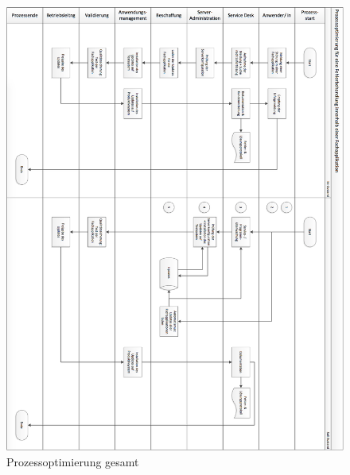     \begin{figure}
	    \centering
	    \includegraphics[width=16cm]
	    {kapitel/anhang/prozessoptimierung_gesamt_hoch}
	    \caption{Prozessoptimierung gesamt}
	    \label{fig_prozessoptimierung_gesamt}
    \end{figure}
